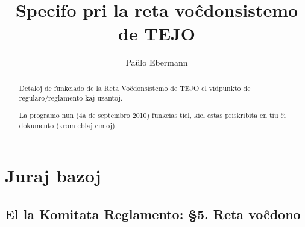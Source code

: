 \documentclass[draft]{scrartcl}
\begin{document}
\title{Specifo pri la reta voĉdonsistemo de TEJO}
\author{Paŭlo Ebermann}

\maketitle

\vspace*{-\baselineskip}

\begin{abstract}
  Detaloj de funkciado de la Reta Voĉdonsistemo de TEJO
  el vidpunkto de regularo/reglamento kaj uzantoj.

  La programo nun (4a de septembro 2010) funkcias tiel, kiel
  estas priskribita en tiu ĉi dokumento (krom eblaj cimoj).
\end{abstract}
\enlargethispage{2\baselineskip}
\vspace*{-\baselineskip}

\tableofcontents

\section{Juraj bazoj}

\subsection{El la Komitata Reglamento: §5. Reta voĉdono}\label{reglamento}
\end{document}
